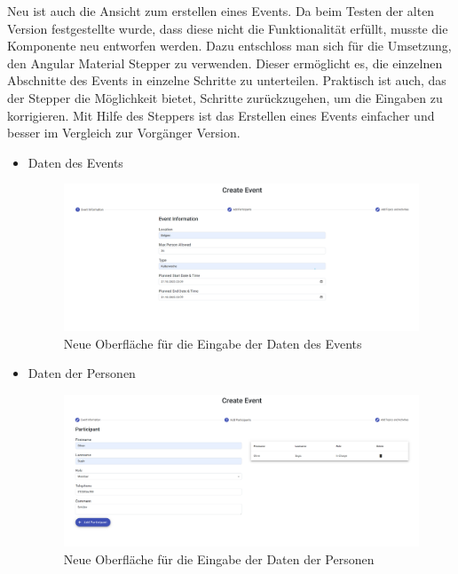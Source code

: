 Neu ist auch die Ansicht zum erstellen eines Events. Da beim Testen der alten Version festgestellte wurde, dass diese nicht die Funktionalität erfüllt, musste die Komponente neu entworfen werden. Dazu entschloss man sich für die Umsetzung, den Angular Material Stepper zu verwenden. Dieser ermöglicht es, die einzelnen Abschnitte des Events in einzelne Schritte zu unterteilen. Praktisch ist auch, das der Stepper die Möglichkeit bietet, Schritte zurückzugehen, um die Eingaben zu korrigieren. Mit Hilfe des Steppers ist das Erstellen eines Events einfacher und besser im Vergleich zur Vorgänger Version.


\begin{itemize}
    \item Daten des Events
    \begin{figure}[h]
        \centering
        \includegraphics[scale=0.27]{pics/new_create_1.png}
        \caption{Neue Oberfläche für die Eingabe der Daten des Events}
        \label{lst:new_create_event_1}
    \end{figure}
    \item Daten der Personen
    \begin{figure}[h]
        \centering
        \includegraphics[scale=0.27]{pics/new_create_2.png}
        \caption{Neue Oberfläche für die Eingabe der Daten der Personen}
        \label{lst:new_create_event_2}
    \end{figure}
    


\end{itemize}
